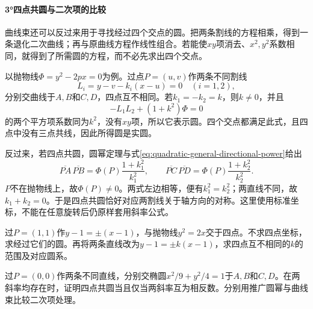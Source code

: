 \newpage
\paragraph{3°四点共圆与二次项的比较} \mbox{}

曲线束还可以反过来用于寻找经过四个交点的圆。把两条割线的方程相乘，得到一条退化二次曲线；再与原曲线方程作线性组合。若能使\(xy\)项消去、\(x^2,y^2\)系数相同，就得到了所需圆的方程，而不必先求出四个交点。

以抛物线\(\Phi=y^2-2px=0\)为例。过点\(P=(u,v)\)作两条不同割线
\begin{equation*}
 L_i=y-v-k_i(x-u)=0\quad(i=1,2),
\end{equation*}
分别交曲线于\(A,B\)和\(C,D\)，四点互不相同。若\(k_1=-k_2=k\)，则\(k\ne0\)，并且
\begin{equation}\label{eq:quadratic-four-concyclic-pencil}
 -L_1L_2+(1+k^2)\Phi=0
\end{equation}
的两个平方项系数同为\(k^2\)，没有\(xy\)项，所以它表示圆。四个交点都满足此式，且四点中没有三点共线，因此所得圆是实圆。

反过来，若四点共圆，圆幂定理与式\eqref{eq:quadratic-general-directional-power}给出
\begin{equation*}
 \overline{PA}\,\overline{PB}
 =\Phi(P)\frac{1+k_1^2}{k_1^2},\qquad
 \overline{PC}\,\overline{PD}
 =\Phi(P)\frac{1+k_2^2}{k_2^2}.
\end{equation*}
\(P\)不在抛物线上，故\(\Phi(P)\ne0\)。两式左边相等，便有\(k_1^2=k_2^2\)；两直线不同，故\(k_1+k_2=0\)。于是四点共圆恰好对应两割线关于轴方向的对称。这里使用标准坐标，不能在任意旋转后仍原样套用斜率公式。

\par\noindent\begin{minipage}{\linewidth}
\begin{example}
过\(P=(1,1)\)作\(y-1=\pm(x-1)\)，与抛物线\(y^2=2x\)交于四点。不求四点坐标，求经过它们的圆。再将两条直线改为\(y-1=\pm k(x-1)\)，求四点互不相同的\(k\)的范围及对应圆系。
\end{example}
\end{minipage}\par

\par\noindent\begin{minipage}{\linewidth}
\begin{example}
过\(P=(0,0)\)作两条不同直线，分别交椭圆\(x^2/9+y^2/4=1\)于\(A,B\)和\(C,D\)。在两斜率均存在时，证明四点共圆当且仅当两斜率互为相反数。分别用推广圆幂与曲线束比较二次项处理。
\end{example}
\end{minipage}\par


